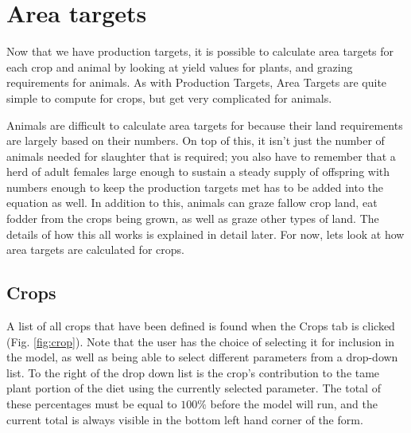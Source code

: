 \section{Area targets}
Now that we have production targets, it is possible to calculate area targets for each crop and animal by looking at yield values for plants, and grazing requirements for animals.  As with Production Targets, Area Targets are quite simple to compute for crops, but get very complicated for animals.

Animals are difficult to calculate area targets for because their land requirements are largely based on their numbers.  On top of this, it isn't just the number of animals needed for slaughter that is required; you also have to remember that a herd of adult females large enough to sustain a steady supply of offspring with numbers enough to keep the production targets met has to be added into the equation as well.  In addition to this, animals can graze fallow crop land, eat fodder from the crops being grown, as well as graze other types of land.  The details of how this all works is explained in detail later.  For now, lets look at how area targets are calculated for crops.

  \subsection{Crops}
    A list of all crops that have been defined is found when the Crops tab is clicked (Fig. \ref{fig:crop}).  Note that the user has the
choice of selecting it for inclusion in the model, as well as being able to select different parameters from a drop-down list.  To the
right of the drop down list is the crop's contribution to the tame plant portion of the diet using the currently selected parameter.  The total of these percentages must be equal to $100\%$ before the model will run, and the current total is always visible in the bottom left
hand corner of the form.

